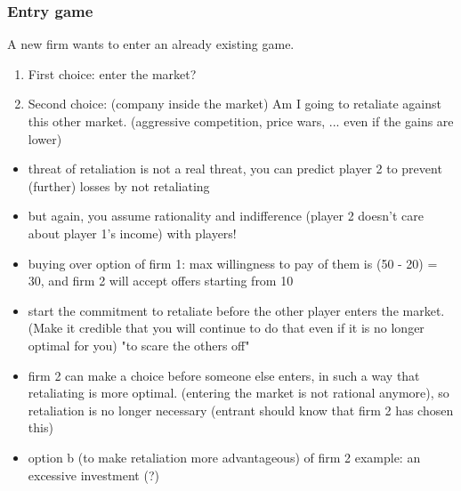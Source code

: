\documentclass[12pt, a4paper, titlepage]{extarticle}
\begin{document}
    \subsubsection{Entry game}
    A new firm wants to enter an already existing game.
    \begin{enumerate}
        \item First choice: enter the market?
        \item Second choice: (company inside the market) Am I going to retaliate against this other market. (aggressive competition, price wars, ... even if the gains are lower)
    \end{enumerate}
    \begin{itemize}
        \item threat of retaliation is not a real threat, you can predict player 2 to prevent (further) losses by not retaliating
        \item but again, you assume rationality and indifference (player 2 doesn't care about player 1's income) with players!
        \item buying over option of firm 1: max willingness to pay of them is (50 - 20) = 30, and firm 2 will accept offers starting from 10
        \item start the commitment to retaliate before the other player enters the market. (Make it credible that you will continue to do that even if it is no longer optimal for you) "to scare the others off"
        \item firm 2 can make a choice before someone else enters, in such a way that retaliating is more optimal. (entering the market is not rational anymore), so retaliation is no longer necessary (entrant should know that firm 2 has chosen this)
        \item option b (to make retaliation more advantageous) of firm 2 example: an excessive investment (?)
    \end{itemize}
\end{document}
